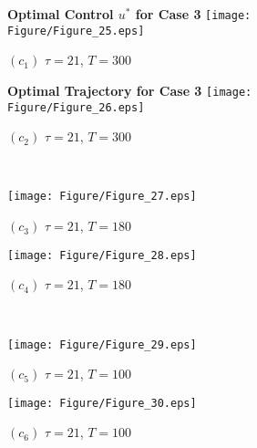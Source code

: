 \documentclass[10pt,letterpaper]{article}
\begin{document}
\begin{figure}[H]
    \centering
    \begin{subfigure}[t]{0.48\textwidth}
        \centering
        \textbf{Optimal Control $u^*$ for Case 3}
        \texttt{[image: Figure/Figure\_25.eps]}
        \par \vspace{1pt} $(c_1)$ $\tau = 21$, $T = 300$
    \end{subfigure}
    \hfill
    \begin{subfigure}[t]{0.48\textwidth}
        \centering
        \textbf{Optimal Trajectory for Case 3}
        \texttt{[image: Figure/Figure\_26.eps]}
        \par \vspace{1pt} $(c_2)$ $\tau = 21$, $T = 300$
    \end{subfigure}
    \\[10pt] %
    
    \begin{subfigure}[t]{0.48\textwidth}
        \centering
        \texttt{[image: Figure/Figure\_27.eps]}
        \par \vspace{1pt} $(c_3)$ $\tau = 21$, $T = 180$
    \end{subfigure}
    \hfill
    \begin{subfigure}[t]{0.48\textwidth}
        \centering
        \texttt{[image: Figure/Figure\_28.eps]}
        \par \vspace{1pt} $(c_4)$ $\tau = 21$, $T = 180$
    \end{subfigure}
    \\[10pt]
    
    \begin{subfigure}[t]{0.48\textwidth}
        \centering
        \texttt{[image: Figure/Figure\_29.eps]}
        \par \vspace{1pt} $(c_5)$ $\tau = 21$, $T = 100$
    \end{subfigure}
    \hfill
    \begin{subfigure}[t]{0.48\textwidth}
        \centering
        \texttt{[image: Figure/Figure\_30.eps]}
        \par \vspace{1pt} $(c_6)$ $\tau = 21$, $T = 100$
    \end{subfigure}
    \\[10pt]
    

\end{figure}
\end{document}
